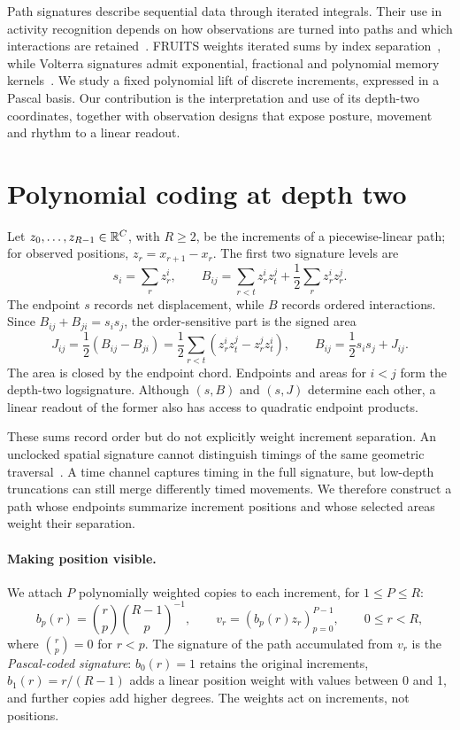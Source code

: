 \documentclass[a4paper]{esannV2}
\begin{document}
Path signatures describe sequential data through iterated integrals.
Their use in activity recognition depends on how observations are turned into
paths and which interactions are retained~\cite{yang,generalised}.
FRUITS weights iterated sums
by index separation~\cite{fruits}, while Volterra signatures admit exponential,
fractional and polynomial memory kernels~\cite{volterra}.
We study a fixed polynomial lift of discrete increments, expressed in a
Pascal basis. Our contribution is the interpretation and use of its depth-two
coordinates, together with observation designs that expose posture, movement
and rhythm to a linear readout.

\section{Polynomial coding at depth two}
Let $z_0,\ldots,z_{R-1}\in\mathbb{R}^C$, with $R\geq2$,
be the increments of a piecewise-linear path; for observed positions, $z_r=x_{r+1}-x_r$.
The first two signature levels are
\begin{equation}
 s_i=\sum_r z_r^i,\qquad
 B_{ij}=\sum_{r<t}z_r^i z_t^j+\frac12\sum_r z_r^i z_r^j.
 \label{eq:signature}
\end{equation}
The endpoint $s$ records net displacement, while $B$ records ordered
interactions. Since $B_{ij}+B_{ji}=s_i s_j$, the order-sensitive part is the
signed area
\begin{equation}
 J_{ij}=\frac12(B_{ij}-B_{ji})
       =\frac12\sum_{r<t}(z_r^i z_t^j-z_r^j z_t^i),\qquad
 B_{ij}=\frac12s_i s_j+J_{ij}.
 \label{eq:area}
\end{equation}
The area is closed by the endpoint chord. Endpoints and areas for $i<j$
form the depth-two logsignature.
Although $(s,B)$ and $(s,J)$ determine each other, a linear readout of the
former also has access to quadratic endpoint products.

These sums record order but do not explicitly weight increment separation.
An unclocked spatial signature cannot distinguish timings of the same geometric
traversal~\cite{generalised}. A time channel captures timing in the full signature,
but low-depth truncations can still merge differently timed movements. We
therefore construct a path whose endpoints summarize increment positions and
whose selected areas weight their separation.

\paragraph{Making position visible.}
We attach $P$ polynomially weighted copies to each increment,
for $1\leq P\leq R$:
\begin{equation}
 b_p(r)=\binom rp\binom{R-1}p^{-1},\qquad
 v_r=(b_p(r)z_r)_{p=0}^{P-1},\qquad 0\leq r<R,
 \label{eq:lift}
\end{equation}
where $\binom rp=0$ for $r<p$. The signature of the path accumulated
from $v_r$ is the \emph{Pascal-coded signature}: $b_0(r)=1$ retains the
original increments, $b_1(r)=r/(R-1)$ adds a linear position weight with values
between 0 and 1, and further copies add higher degrees. The weights act on
increments, not positions.
\end{document}
